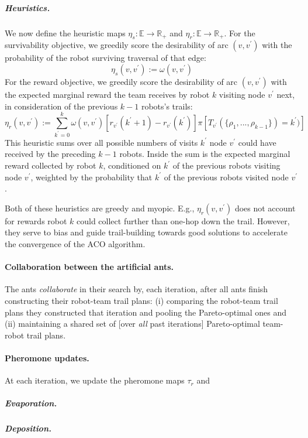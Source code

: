 \documentclass[11pt, oneside]{article}
\begin{document}
\subparagraph{Heuristics.} We now define the heuristic maps $\eta_s: \mathbb{E} \rightarrow \mathbb{R}_+$ and $\eta_r:  \mathbb{E} \rightarrow \mathbb{R}_+$.
For the survivability objective, we greedily score the desirability of arc $(v, v^\prime)$ with the probability of the robot surviving traversal of that edge:
\begin{equation}
	\eta_s(v, v^\prime):=\omega(v, v^\prime) 
\end{equation}
For the reward objective, we greedily score the desirability of arc $(v, v^\prime)$ with the expected marginal reward the team receives by robot $k$ visiting node $v^\prime$ next, in consideration of the previous $k-1$ robots's trails:
\begin{equation}
	\eta_r(v, v^\prime) :=  \sum_{k^\prime=0}^k \omega(v, v^\prime)  [r_{v^\prime}(k^\prime+1) - r_{v^\prime}(k^\prime)]
	 \pi[ T_{v^\prime}(\{\rho_1, ..., \rho_{k-1}\}) = k^\prime )]
\end{equation}
This heuristic sums over all possible numbers of visits $k^\prime$ node $v^\prime$ could have received by the preceding $k-1$ robots. Inside the sum is the expected marginal reward collected by robot $k$, conditioned on $k^\prime$ of the previous robots visiting node $v^\prime$, weighted by the probability that $k^\prime$ of the previous robots visited node $v^\prime$.

Both of these heuristics are greedy and myopic. E.g., $\eta_r(v, v^\prime)$ does not account for rewards robot $k$ could collect further than one-hop down the trail. 
However, they serve to bias and guide trail-building towards good solutions to accelerate the convergence of the ACO algorithm. 

\paragraph{Collaboration between the artificial ants.}
The ants \emph{collaborate} in their search by, each iteration, after all ants finish constructing their robot-team trail plans:
(i) comparing the robot-team trail plans they constructed that iteration and pooling the Pareto-optimal ones and
(ii) maintaining a shared set of [over \emph{all} past iterations] Pareto-optimal team-robot trail plans.


\paragraph{Pheromone updates.} At each iteration, we update the pheromone maps $\tau_r$ and 
\subparagraph{Evaporation.}
\subparagraph{Deposition.}
\end{document}
